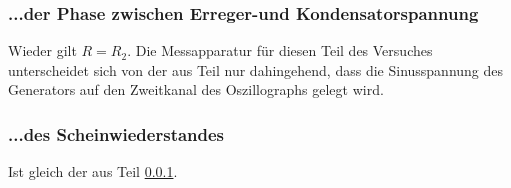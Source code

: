 \subsubsection{...der Phase zwischen Erreger-und Kondensatorspannung}
\label{sssec:a4}
Wieder gilt $R=R_2$. Die Messapparatur für diesen Teil des Versuches
unterscheidet sich von der aus Teil \label{sec:a12} nur dahingehend, dass
die Sinusspannung des Generators auf den Zweitkanal des Oszillographs gelegt
wird.
\subsubsection{...des Scheinwiederstandes}
Ist gleich der aus Teil \ref{sssec:a4}.
